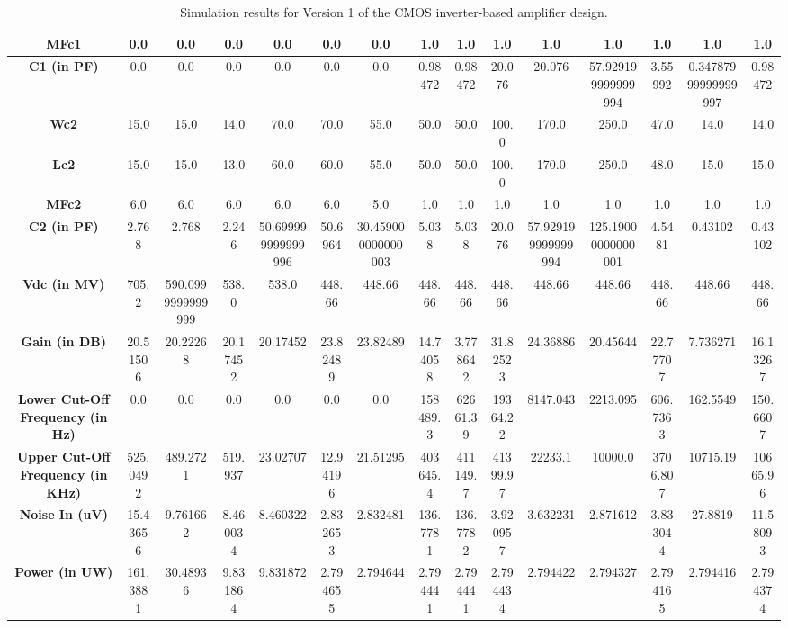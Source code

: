 \begin{landscape}
\begin{table}[!ht]
\begin{adjustbox}{max width=\linewidth}
\begin{tabular}{|c|c|c|c|c|c|c|c|c|c|c|c|c|c|c|}
            \textbf{MFc1} & 0.0 & 0.0 & 0.0 & 0.0 & 0.0 & 0.0 & 1.0 & 1.0 & 1.0 & 1.0 & 1.0 & 1.0 & 1.0 & 1.0 \\ \hline
            \textbf{C1 (in PF)} & 0.0 & 0.0 & 0.0 & 0.0 & 0.0 & 0.0 & 0.98472 & 0.98472 & 20.076 & 20.076 & 57.929199999999994 & 3.55992 & 0.34787999999999997 & 0.98472 \\ \hline
            \textbf{Wc2} & 15.0 & 15.0 & 14.0 & 70.0 & 70.0 & 55.0 & 50.0 & 50.0 & 100.0 & 170.0 & 250.0 & 47.0 & 14.0 & 14.0 \\ \hline
            \textbf{Lc2} & 15.0 & 15.0 & 13.0 & 60.0 & 60.0 & 55.0 & 50.0 & 50.0 & 100.0 & 170.0 & 250.0 & 48.0 & 15.0 & 15.0 \\ \hline
            \textbf{MFc2} & 6.0 & 6.0 & 6.0 & 6.0 & 6.0 & 5.0 & 1.0 & 1.0 & 1.0 & 1.0 & 1.0 & 1.0 & 1.0 & 1.0 \\ \hline
            \textbf{C2 (in PF)} & 2.768 & 2.768 & 2.246 & 50.699999999999996 & 50.6964 & 30.459000000000003 & 5.038 & 5.038 & 20.076 & 57.929199999999994 & 125.19000000000001 & 4.5481 & 0.43102 & 0.43102 \\ \hline
            \textbf{Vdc (in MV)} & 705.2 & 590.0999999999999 & 538.0 & 538.0 & 448.66 & 448.66 & 448.66 & 448.66 & 448.66 & 448.66 & 448.66 & 448.66 & 448.66 & 448.66 \\ \hline
            \textbf{Gain (in DB)} & 20.51506 & 20.22268 & 20.17452 & 20.17452 & 23.82489 & 23.82489 & 14.74058 & 3.778642 & 31.82523 & 24.36886 & 20.45644 & 22.77707 & 7.736271 & 16.13267 \\ \hline
            \textbf{Lower Cut-Off Frequency (in Hz)} & 0.0 & 0.0 & 0.0 & 0.0 & 0.0 & 0.0 & 158489.3 & 62661.39 & 19364.22 & 8147.043 & 2213.095 & 606.7363 & 162.5549 & 150.6607 \\ \hline
            \textbf{Upper Cut-Off Frequency (in KHz)} & 525.0492 & 489.2721 & 519.937 & 23.02707 & 12.94196 & 21.51295 & 403645.4 & 411149.7 & 41399.97 & 22233.1 & 10000.0 & 3706.807 & 10715.19 & 10665.96 \\ \hline
            \textbf{Noise In (uV)} & 15.43656 & 9.761662 & 8.460034 & 8.460322 & 2.832653 & 2.832481 & 136.7781 & 136.7782 & 3.920957 & 3.632231 & 2.871612 & 3.833044 & 27.8819 & 11.58093 \\ \hline
            \textbf{Power (in UW)} & 161.3881 & 30.48936 & 9.831864 & 9.831872 & 2.794655 & 2.794644 & 2.794441 & 2.794441 & 2.794434 & 2.794422 & 2.794327 & 2.794165 & 2.794416 & 2.794374 \\ \hline
    \end{tabular}
    \end{adjustbox}
    \caption{Simulation results for Version 1 of the CMOS inverter-based amplifier design.}
    \label{tab:v1_sim_results}
\end{table}
\end{landscape}

